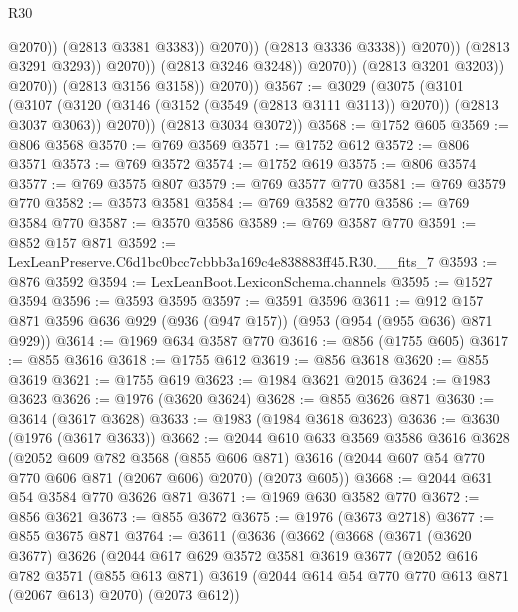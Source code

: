 \begin{lexlean}{R30}
\begin{coremodule}
                                            @2070))
                                        (@2813 @3381 @3383))
                                      @2070))
                                  (@2813 @3336 @3338))
                                @2070))
                            (@2813 @3291 @3293))
                          @2070))
                      (@2813 @3246 @3248))
                    @2070))
                (@2813 @3201 @3203))
              @2070))
          (@2813 @3156 @3158))
        @2070))
@3567 := @3029
    (@3075
      (@3101
        (@3107 (@3120 (@3146 (@3152 (@3549 (@2813 @3111 @3113)) @2070)) (@2813 @3037 @3063)) @2070))
      (@2813 @3034 @3072))
@3568 := @1752 @605
@3569 := @806 @3568
@3570 := @769 @3569
@3571 := @1752 @612
@3572 := @806 @3571
@3573 := @769 @3572
@3574 := @1752 @619
@3575 := @806 @3574
@3577 := @769 @3575 @807
@3579 := @769 @3577 @770
@3581 := @769 @3579 @770
@3582 := @3573 @3581
@3584 := @769 @3582 @770
@3586 := @769 @3584 @770
@3587 := @3570 @3586
@3589 := @769 @3587 @770
@3591 := @852 @157 @871
@3592 := LexLeanPreserve.C6d1bc0bcc7cbbb3a169c4e838883ff45.R30.__fits_7
@3593 := @876 @3592
@3594 := LexLeanBoot.LexiconSchema.channels
@3595 := @1527 @3594
@3596 := @3593 @3595
@3597 := @3591 @3596
@3611 := @912 @157 @871 @3596 @636 @929 (@936 (@947 @157)) (@953 (@954 (@955 @636) @871 @929))
@3614 := @1969 @634 @3587 @770
@3616 := @856 (@1755 @605)
@3617 := @855 @3616
@3618 := @1755 @612
@3619 := @856 @3618
@3620 := @855 @3619
@3621 := @1755 @619
@3623 := @1984 @3621 @2015
@3624 := @1983 @3623
@3626 := @1976 (@3620 @3624)
@3628 := @855 @3626 @871
@3630 := @3614 (@3617 @3628)
@3633 := @1983 (@1984 @3618 @3623)
@3636 := @3630 (@1976 (@3617 @3633))
@3662 := @2044
    @610
    @633
    @3569
    @3586
    @3616
    @3628
    (@2052
      @609
      @782
      @3568
      (@855 @606 @871)
      @3616
      (@2044 @607 @54 @770 @770 @606 @871 (@2067 @606) @2070)
      (@2073 @605))
@3668 := @2044 @631 @54 @3584 @770 @3626 @871
@3671 := @1969 @630 @3582 @770
@3672 := @856 @3621
@3673 := @855 @3672
@3675 := @1976 (@3673 @2718)
@3677 := @855 @3675 @871
@3764 := @3611
    (@3636
      (@3662
        (@3668
          (@3671
            (@3620 @3677)
            @3626
            (@2044
              @617
              @629
              @3572
              @3581
              @3619
              @3677
              (@2052
                @616
                @782
                @3571
                (@855 @613 @871)
                @3619
                (@2044 @614 @54 @770 @770 @613 @871 (@2067 @613) @2070)
                (@2073 @612))

\end{coremodule}
\end{lexlean}
